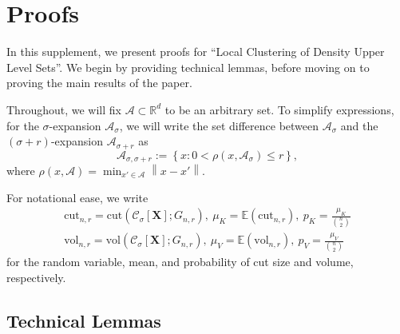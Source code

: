 \documentclass{article}
\newcommand{\set}[1]{\left\{#1\right\}}
\newcommand{\vol}{\mathrm{vol}}
\newcommand{\Reals}{\mathbb{R}}
\newcommand{\Rd}{\Reals^d}
\newcommand{\norm}[1]{\left\lVert#1\right\rVert}
\newcommand{\1}{\mathbf{1}}
\newcommand{\cut}{\mathrm{cut}}
\newcommand{\Xbf}{\mathbf{X}}
\newcommand{\Cset}{\mathcal{C}}
\newcommand{\Aset}{\mathcal{A}}
\newcommand{\Asig}{\Aset_{\sigma}}
\newcommand{\Csig}{\Cset_{\sigma}}
\newcommand{\Asigr}{\Aset_{\sigma,\sigma + r}}
\theoremstyle{aldenthm}
\begin{document}








\section{Proofs}

In this supplement, we present proofs for ``Local Clustering of Density Upper Level Sets''. We begin by providing technical lemmas, before moving on to proving the main results of the paper. 

Throughout, we will fix $\Aset \subset \Rd$ to be an arbitrary set. To simplify expressions, for the $\sigma$-expansion $\Asig$, we will write the set difference between $\Asig$ and the $(\sigma + r)$-expansion $\Aset_{\sigma + r}$ as 
\begin{equation*}
\Asigr := \set{x: 0 < \rho(x, \Asig) \leq r},
\end{equation*}
where $\rho(x, \Aset) = \min_{x' \in \Aset} \norm{x - x'}$.

For notational ease, we write
\begin{align*}
\cut_{n,r} = \cut(\Csig[\Xbf]; G_{n,r}), ~ \mu_K = \mathbb{E}(\cut_{n,r}), ~ p_K = \frac{\mu_K}{{n \choose 2}} \\
\vol_{n,r} = \vol(\Csig[\Xbf]; G_{n,r}), ~ \mu_V = \mathbb{E}(\vol_{n,r}), ~ p_V = \frac{\mu_V}{{n \choose 2}}
\end{align*}
for the random variable, mean, and probability of cut size and volume, respectively.

\subsection{Technical Lemmas}
\end{document}
